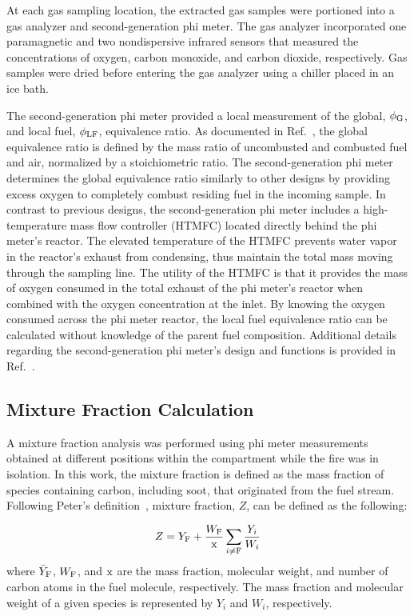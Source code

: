 \documentclass[12pt,letterpaper]{article}
\begin{document}
\begin{flushleft}
At each gas sampling location, the extracted gas samples were portioned into a gas analyzer and second-generation phi meter. The gas analyzer incorporated one paramagnetic and two nondispersive infrared sensors that measured the concentrations of oxygen, carbon monoxide, and carbon dioxide, respectively. Gas samples were dried before entering the gas analyzer using a chiller placed in an ice bath.

The second-generation phi meter provided a local measurement of the global, $\phi_{\rm{G}}$, and local fuel, $\phi_{\rm{LF}}$, equivalence ratio. As documented in Ref.~\cite{}, the global equivalence ratio is defined by the mass ratio of uncombusted and combusted fuel and air, normalized by a stoichiometric ratio. The second-generation phi meter determines the global equivalence ratio  similarly to other designs by providing excess oxygen to completely combust residing fuel in the incoming sample. In contrast to previous designs, the second-generation phi meter includes a high-temperature mass flow controller (HTMFC) located directly behind the phi meter's reactor. The elevated temperature of the HTMFC prevents water vapor in the reactor's exhaust from condensing, thus maintain the total mass moving through the sampling line. The utility of the HTMFC is that it provides the mass of oxygen consumed in the total exhaust of the phi meter's reactor when combined with the oxygen concentration at the inlet. By knowing the oxygen consumed across the phi meter reactor, the local fuel equivalence ratio can be calculated without knowledge of the parent fuel composition. Additional details regarding the second-generation phi meter's design and functions is provided in Ref.~\cite{Falkenstein2021phimeter}.

\subsection{Mixture Fraction Calculation}
\label{ssec:Mix_Frac_Calc}
A mixture fraction analysis was performed using phi meter measurements obtained at different positions within the compartment while the fire was in isolation. In this work, the mixture fraction is defined as the mass fraction of species containing carbon, including soot, that originated from the fuel stream. Following Peter's definition~\cite{peters1984laminar}, mixture fraction, $Z$, can be defined as the following:

\begin{equation}\label{eq:Mixture_Fraction}
  Z = {Y}_{\rm F} + \frac{W_{\rm F}}{\rm x} \sum_{i\ne {\rm F}} \frac{{Y}_i}{W_{i}}
\end{equation}
where $\bar{Y}_{\rm F}$, ${W_{\rm F}}$, and $\rm x$ are the mass fraction, molecular weight, and number of carbon atoms in the fuel molecule, respectively. The mass fraction and molecular weight of a given species is represented by ${Y}_i$ and ${W_{i}}$, respectively.    


\end{flushleft}
\end{document}
